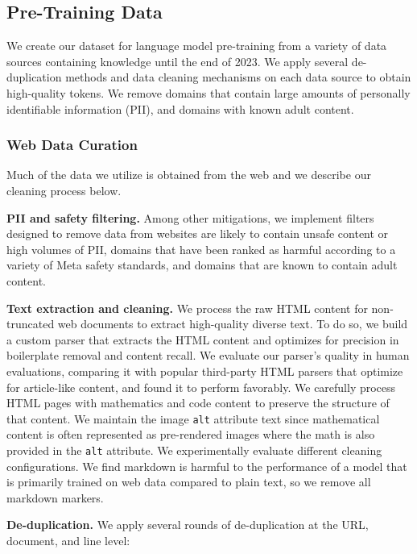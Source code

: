 \providecommand{\llama}[1]{\textsc{Llama #1}}

\subsection{Pre-Training Data}
\label{section:pretraining_data}

We create our dataset for language model pre-training from a variety of data sources containing knowledge until the end of 2023. 
We apply several de-duplication methods and data cleaning mechanisms on each data source to obtain high-quality tokens. We remove domains that contain large amounts of personally identifiable information (PII), and domains with known adult content. %

\subsubsection{Web Data Curation}
Much of the data we utilize is obtained from the web and we describe our cleaning process below. 

\textbf{PII and safety filtering.}
Among other mitigations, we implement filters designed to remove data from websites are likely to contain unsafe content or high volumes of PII, domains that have been ranked as harmful according to a variety of Meta safety standards, and domains that are known to contain adult content.

\textbf{Text extraction and cleaning.}
We process the raw HTML content for non-truncated web documents to extract high-quality diverse text.
To do so, we build a custom parser that extracts the HTML content and optimizes for precision in boilerplate removal and content recall.
We evaluate our parser's quality in human evaluations, comparing it with popular third-party HTML parsers that optimize for article-like content, and found it to perform favorably.
We carefully process HTML pages with mathematics and code content to preserve the structure of that content. 
We maintain the image \texttt{alt} attribute text since mathematical content is often represented as pre-rendered images where the math is also provided in the \texttt{alt} attribute.
We experimentally evaluate different cleaning configurations. 
We find markdown is harmful to the performance of a model that is primarily trained on web data compared to plain text, so we remove all markdown markers.

\textbf{De-duplication.}
We apply several rounds of de-duplication at the URL, document, and line level:

